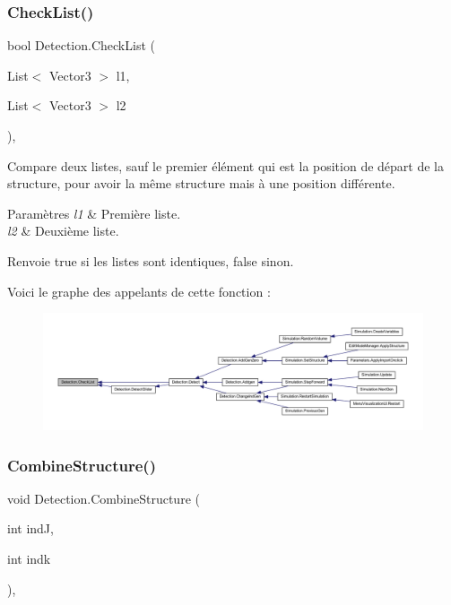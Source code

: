 \subsubsection{\texorpdfstring{Check\+List()}{CheckList()}}
{\footnotesize\ttfamily bool Detection.\+Check\+List (\begin{DoxyParamCaption}\item[{List$<$ Vector3 $>$}]{l1,  }\item[{List$<$ Vector3 $>$}]{l2 }\end{DoxyParamCaption})\hspace{0.3cm}{\ttfamily [inline]}, {\ttfamily [private]}}



Compare deux listes, sauf le premier élément qui est la position de départ de la structure, pour avoir la même structure mais à une position différente. 


\begin{DoxyParams}{Paramètres}
{\em l1} & Première liste.\\
\hline
{\em l2} & Deuxième liste.\\
\hline
\end{DoxyParams}
\begin{DoxyReturn}{Renvoie}
true si les listes sont identiques, false sinon.
\end{DoxyReturn}
Voici le graphe des appelants de cette fonction \+:
\nopagebreak
\begin{figure}[H]
\begin{center}
\leavevmode
\includegraphics[width=350pt]{class_detection_a2d8aeb536aa1051f0522f8317b14b36e_icgraph}
\end{center}
\end{figure}
\mbox{\label{class_detection_a7a133b5ef43e949260afb4685766e0ca}} 
\subsubsection{\texorpdfstring{Combine\+Structure()}{CombineStructure()}}
{\footnotesize\ttfamily void Detection.\+Combine\+Structure (\begin{DoxyParamCaption}\item[{int}]{indJ,  }\item[{int}]{indk }\end{DoxyParamCaption})\hspace{0.3cm}{\ttfamily [inline]}, {\ttfamily [private]}}



